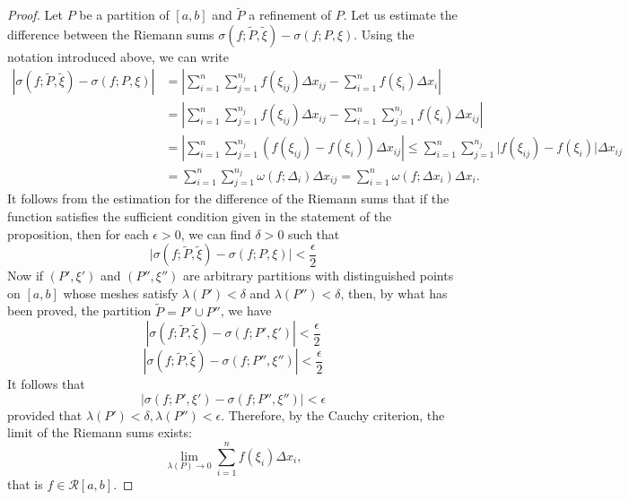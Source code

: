 \documentclass[a4paper,12pt]{article} %
\begin{document}
\begin{proof}
    Let $P$ be a partition of $[a,b]$ and $\widetilde{P}$ a refinement of 
    $P$. Let us estimate the difference between the Riemann sums 
    $\sigma(f;\widetilde{P},\widetilde{\xi}) - \sigma(f;P,\xi)$. Using the notation 
    introduced above, we can write
    \[
        \begin{split}
        \left\vert \sigma(f;\widetilde{P},\widetilde{\xi}) - 
            \sigma(f;P,\xi)\right\vert 
        & = \left\vert \sum_{i=1}^n\sum_{j=1}^{n_j}f(\xi_{ij})\Delta x_{ij} - \sum_{i=1}^nf(\xi_i)\Delta x_i 
            \right\vert \\
            & = \left\vert \sum_{i=1}^n\sum_{j=1}^{n_j}f(\xi_{ij})\Delta x_{ij} - \sum_{i=1}^n\sum_{j=1}^{n_j}f(\xi_i)\Delta x_{ij} 
            \right\vert \\
        & = \left\vert\sum_{i=1}^n\sum_{j=1}^{n_j}(f(\xi_{ij}) - f(\xi_i))\Delta x_{ij}\right\vert 
             \le \sum_{i=1}^{n}\sum_{j=1}^{n_j}\vert f(\xi_{ij}) - f(\xi_i) \vert \Delta x_{ij} \\
        & = \sum_{i=1}^n\sum_{j=1}^{n_j}\omega(f;\Delta_i)\Delta x_{ij} = \sum_{i=1}^n\omega(f;\Delta x_i)\Delta x_i.
        \end{split}
        \]
    It follows from the estimation for the difference of the Riemann 
    sums that if the function satisfies the sufficient condition given 
    in the statement of the proposition, then for each $\epsilon > 0$, we can 
    find $\delta > 0$ such that 
    \[
        \vert \sigma(f;\widetilde{P},\widetilde{\xi}) - \sigma(f;P,\xi) \vert < \frac{\epsilon}{2}
       \]
    Now if $(P',\xi')$ and $(P'',\xi'')$ are arbitrary partitions with distinguished 
    points on $[a,b]$ whose meshes satisfy $\lambda(P') < \delta$ and $\lambda(P'') < \delta$, then,
    by what has been proved, the partition $\widetilde{P} = P'\cup P'' $,
    we have 
    \[
        \left\vert \sigma(f;\widetilde{P},\widetilde{\xi}) - 
        \sigma(f;P',\xi') \right \vert < \frac{\epsilon}{2}
        \]
    \[
        \left\vert \sigma(f;\widetilde{P},\widetilde{\xi}) - 
        \sigma(f;P'',\xi'') \right \vert < \frac{\epsilon}{2}
        \]
    It follows that 
    \[
        \left\vert \sigma(f;P',\xi') - \sigma(f;P'',\xi'') \right\vert < \epsilon
        \]
    provided that $\lambda(P') < \delta, \lambda(P'') < \epsilon$. Therefore, by the Cauchy 
    criterion, the limit of the Riemann sums exists:
    \[
        \lim_{\lambda(P)\to 0} \sum_{i=1}^nf(\xi_i)\Delta x_i,
        \]
    that is $f \in \mathcal{R} [a,b]$.
\end{proof}
\end{document}
